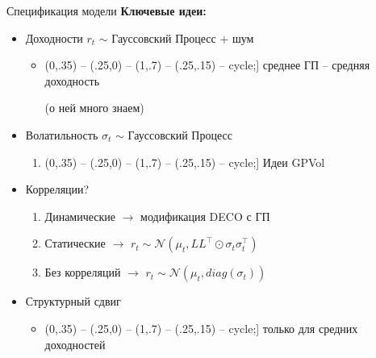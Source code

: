 \documentclass[14pt]{beamer}
\def\checkmarksmall{\tikz\fill[scale=0.5](0,.35) -- (.25,0) -- (1,.7) -- (.25,.15) -- cycle;}
\begin{document}
\begin{frame}{Спецификация модели}
\textbf{Ключевые идеи:}
\begin{itemize}
	\item Доходности $r_t$ $\sim$ Гауссовский Процесс + шум
	\begin{itemize}
		\item[\checkmarksmall] среднее ГП -- средняя доходность
		
		(о ней много знаем)
	\end{itemize}
	\item<2-> Волатильность $\sigma_t$ $\sim$ Гауссовский Процесс
	\begin{enumerate}
		\item[\checkmarksmall] Идеи GPVol
	\end{enumerate}
	\item<3-> Корреляции?
	\begin{enumerate}
		\item Динамические $\rightarrow$ модификация DECO с ГП
		\item Статические $\rightarrow$ $r_t \sim \mathcal{N}(\mu_t, LL^\top\odot\sigma_t\sigma_t^\top)$
		\item Без корреляций $\rightarrow$ $r_t \sim \mathcal{N}(\mu_t, diag(\sigma_t))$
	\end{enumerate}
	\item<4-> Структурный сдвиг
	\begin{itemize}
		\item[\checkmarksmall] только для средних доходностей
	\end{itemize}
\end{itemize}
\end{frame}
\end{document}

